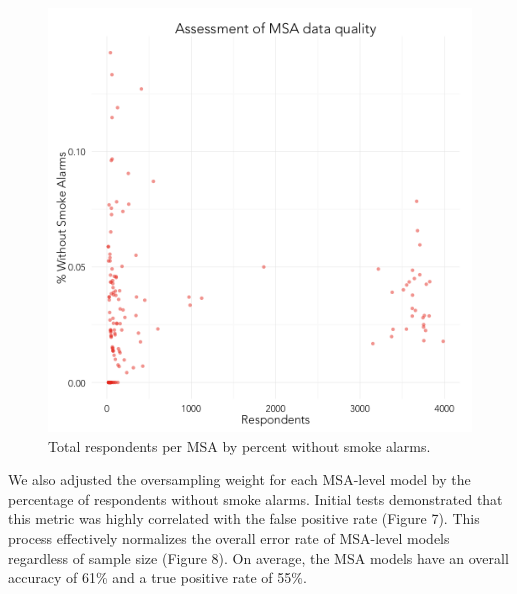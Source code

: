 \documentclass{sig-alternate}
\begin{document}
\begin{figure}
\centering 
\includegraphics[scale=0.42]{compute-msa-stats-scatter-1.png}
\caption{Total respondents per MSA by percent without smoke alarms.}
\end{figure}

We also adjusted the oversampling weight for each MSA-level model by the percentage of respondents without smoke alarms. Initial tests demonstrated that this metric was highly correlated with the false positive rate (Figure 7). This process effectively normalizes the overall error rate of MSA-level models regardless of sample size (Figure 8).  On average, the MSA models have an overall accuracy of 61\% and a true positive rate of 55\%. 
\end{document}
